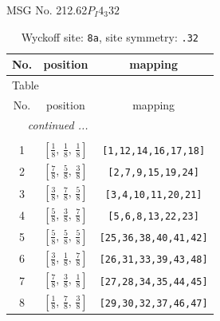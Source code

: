 \documentclass[fleqn,8pt]{jsarticle}
\begin{document}
\setcounter{MaxMatrixCols}{32}

\renewcommand{\tablename}{Table~}
\renewcommand{\figurename}{Figure~}
\begin{center}
\LARGE
MSG No. 212.62\quad$P_{I}4_{3}32$
\end{center}
\renewcommand{\arraystretch}{1.2}
\begin{longtable}{ccc}
\caption{Wyckoff site: {\tt 8a}, site symmetry: {\tt .32}}
 \\
 \hline \hline
No. & position & mapping \\ \hline \endfirsthead

\multicolumn{2}{l}{\tablename\ \thetable{}} \\
 \hline \hline
No. & position & mapping \\ \hline \endhead

 \hline \hline
\multicolumn{2}{r}{\footnotesize\it continued ...} \\ \endfoot

 \hline \hline
\multicolumn{2}{r}{} \\ \endlastfoot

1 & $\left[ \frac{1}{8},\, \frac{1}{8},\, \frac{1}{8} \right]$ & {\tt [1,12,14,16,17,18]} \\ \hline
2 & $\left[ \frac{7}{8},\, \frac{5}{8},\, \frac{3}{8} \right]$ & {\tt [2,7,9,15,19,24]} \\ \hline
3 & $\left[ \frac{3}{8},\, \frac{7}{8},\, \frac{5}{8} \right]$ & {\tt [3,4,10,11,20,21]} \\ \hline
4 & $\left[ \frac{5}{8},\, \frac{3}{8},\, \frac{7}{8} \right]$ & {\tt [5,6,8,13,22,23]} \\ \hline
5 & $\left[ \frac{5}{8},\, \frac{5}{8},\, \frac{5}{8} \right]$ & {\tt [25,36,38,40,41,42]} \\ \hline
6 & $\left[ \frac{3}{8},\, \frac{1}{8},\, \frac{7}{8} \right]$ & {\tt [26,31,33,39,43,48]} \\ \hline
7 & $\left[ \frac{7}{8},\, \frac{3}{8},\, \frac{1}{8} \right]$ & {\tt [27,28,34,35,44,45]} \\ \hline
8 & $\left[ \frac{1}{8},\, \frac{7}{8},\, \frac{3}{8} \right]$ & {\tt [29,30,32,37,46,47]} \\
\end{longtable}
\renewcommand{\arraystretch}{1.2}
\end{document}
